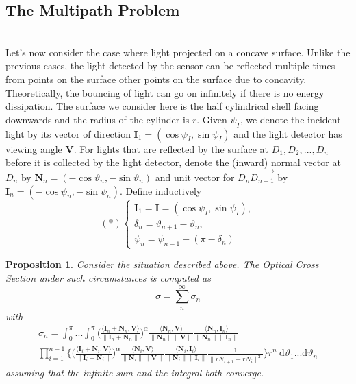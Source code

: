 \documentclass[11pt]{amsart}
\newtheorem{proposition}{Proposition}
\newcommand{\ip}[2]{\langle {#1}, {#2} \rangle}
\theoremstyle{definition}
\begin{document}
\subsection{The Multipath Problem}~\\
Let's now consider the case where light projected on a concave surface. Unlike the previous cases, the light detected by the sensor can be reflected multiple times from points on the surface other points on the surface due to concavity. Theoretically, the bouncing of light can go on infinitely if there is no energy dissipation. The surface we consider here is the half cylindrical shell facing downwards and the radius of the cylinder is $r$. Given $\psi_I$, we denote the incident light by its vector of direction $\mathbf{I}_1=(\cos\psi_I,\sin\psi_I)$ and the light detector has viewing angle $\mathbf{V}$. For lights that are reflected by the surface at $D_1,D_2,...,D_n$ before it is collected by the light detector, denote the (inward) normal vector at $D_n$ by $\mathbf{N}_n=(-\cos\vartheta_n,-\sin\vartheta_n)$ and unit vector for $\overrightarrow{D_{n}D_{n-1}}$ by $\mathbf{I}_n=(-\cos\psi_n,-\sin\psi_n)$.  Define inductively 
$$(*)\begin{cases}\mathbf{I}_1=\mathbf{I}=(\cos\psi_{I},\sin\psi_{I}),\\ \delta_n=\vartheta_{n+1}-\vartheta_n,\\ \psi_n=\psi_{n-1}-(\pi-\delta_n)\end{cases}$$ 

\begin{proposition}
Consider the situation described above. The Optical Cross Section under such circumstances is computed as
$$\sigma=\sum_{n}^{\infty}\sigma_n$$
with
\begin{multline*}
\sigma_n =\int_{0}^{\pi}...\int_{0}^{\pi}\Bigg(\frac{\ip{\mathbf{I}_n+\mathbf{N}_n}{\mathbf{V}}}{\|\mathbf{I}_n+\mathbf{N}_n\|}\Bigg)^\alpha\frac{\ip{\mathbf{N}_n}{\mathbf{V}}}{\|\mathbf{N}_n\| \|\mathbf{V}\|}\frac{\ip{\mathbf{N}_n}{\mathbf{I}_n}}{\|\mathbf{N}_n\| \|\mathbf{I}_n\|} \\\prod_{i=1}^{n-1}\bigg\{ \Bigg(\frac{\ip{\mathbf{I}_i+\mathbf{N}_i}{\mathbf{V}}}{\|\mathbf{I}_i+\mathbf{N}_i\|}\Bigg)^\alpha \frac{\ip{\mathbf{N}_i}{\mathbf{V}}}{\|\mathbf{N}_i\| \|\mathbf{V}\|}\frac{\ip{\mathbf{N}_i}{\mathbf{I}_i}}{\|\mathbf{N}_i\| \|\mathbf{I}_i\|}\frac{1}{\|rN_{i+1}-rN_i\|^2}\bigg\}r^n\: \mathrm{d}\vartheta_1...\mathrm{d}\vartheta_n\end{multline*}
assuming that the infinite sum and the integral both converge.
\end{proposition}
\end{document}
